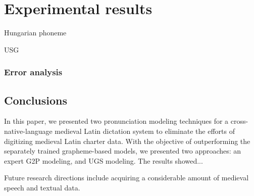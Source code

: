 \documentclass[runningheads,a4paper]{llncs}
\begin{document}
\section{Experimental results}
\begin{table}
\parbox{.45\linewidth}{
\centering
\caption{Hungarian phoneme}

}
\hfill
\parbox{.45\linewidth}{
\centering
\caption{USG}

}
\end{table}
\subsubsection{Error analysis}
\subsection{Conclusions}
In this paper, we presented two pronunciation modeling techniques for a cross-native-language medieval Latin dictation system to eliminate the efforts of digitizing medieval Latin charter data.
With the objective of outperforming the separately trained grapheme-based models, we presented two approaches: an expert G2P modeling, and UGS modeling.
The results showed...

Future research directions include acquiring a considerable amount of medieval speech and textual data.



\end{document}

